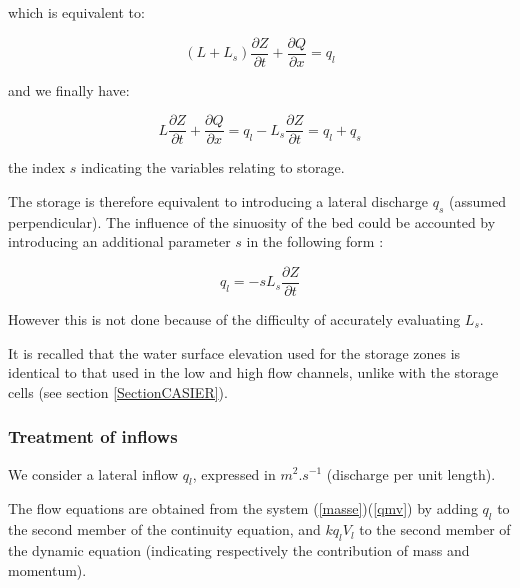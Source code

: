 which is equivalent to:

\begin{equation}
  (L + L_s) \frac{\partial Z}{\partial t} + \frac{\partial Q}{\partial x} = q_l
\end{equation}

and we finally have:

\begin{equation}
  L \frac{\partial Z}{\partial t} + \frac{\partial Q}{\partial x} = q_l - L_s \frac{\partial Z}{\partial t} = q_l + q_s
\end{equation}

the index $s$ indicating the variables relating to storage.

\vspace{0.5cm}

The storage is therefore equivalent to introducing a lateral discharge $q_s$ (assumed perpendicular). The influence of the sinuosity of the bed could be accounted by introducing an additional parameter $s$ in the following form :

\begin{equation}
  q_l = - s L_s \frac{\partial Z}{\partial t}
\end{equation}

\vspace{0.5cm}

However this is not done because of the difficulty of accurately evaluating $L_s$.

\vspace{0.5cm}

It is recalled that the water surface elevation used for the storage zones is identical to that used in the low and high flow channels, unlike with the storage cells (see section \ref{SectionCASIER}).



\subsubsection{Treatment of inflows}
\label{TraitAp}

We consider a lateral inflow $q_l$, expressed in $m^2.s^{-1}$ (discharge per unit length).

\vspace{0.5cm}

The flow equations are obtained from the system (\ref{masse})(\ref{qmv}) by adding $q_l$ to the second member of the continuity equation, and $k q_l V_l$ to the second member of the dynamic equation (indicating respectively the contribution of mass and momentum).

